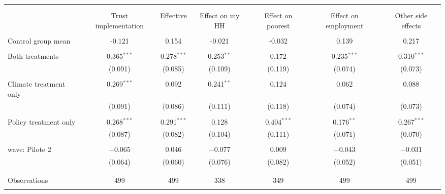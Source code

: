 
\begin{tabular}{@{\extracolsep{5pt}}lcccccc} 
\\[-1.8ex]\hline 
\hline \\[-1.8ex] 
\\[-1.8ex] & Trust implementation & Effective & Effect on my HH & Effect on poorest & Effect on employment & Other side effects \\ 
\hline \\[-1.8ex] 
 Control group mean & -0.121 & 0.154 & -0.021 & -0.032 & 0.139 & 0.217  \\ \hline \\[-1.8ex] Both treatments & 0.365$^{***}$ & 0.278$^{***}$ & 0.253$^{**}$ & 0.172 & 0.235$^{***}$ & 0.310$^{***}$ \\ 
  & (0.091) & (0.085) & (0.109) & (0.119) & (0.074) & (0.073) \\ 
  & & & & & & \\ 
 Climate treatment only & 0.269$^{***}$ & 0.092 & 0.241$^{**}$ & 0.124 & 0.062 & 0.088 \\ 
  & (0.091) & (0.086) & (0.111) & (0.118) & (0.074) & (0.073) \\ 
  & & & & & & \\ 
 Policy treatment only & 0.268$^{***}$ & 0.291$^{***}$ & 0.128 & 0.404$^{***}$ & 0.176$^{**}$ & 0.267$^{***}$ \\ 
  & (0.087) & (0.082) & (0.104) & (0.111) & (0.071) & (0.070) \\ 
  & & & & & & \\ 
 wave: Pilote 2 & $-$0.065 & 0.046 & $-$0.077 & 0.009 & $-$0.043 & $-$0.031 \\ 
  & (0.064) & (0.060) & (0.076) & (0.082) & (0.052) & (0.051) \\ 
  & & & & & & \\ 
\hline \\[-1.8ex] 

Observations & 499 & 499 & 338 & 349 & 499 & 499 \\ 
\hline 
\hline \\[-1.8ex] 
\end{tabular} 